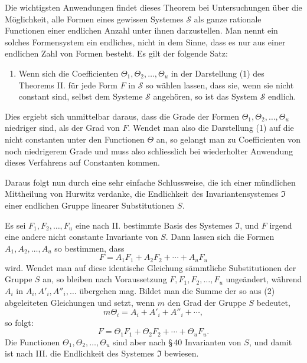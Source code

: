 \documentclass[11pt]{article}
\begin{document}
Die wichtigsten Anwendungen findet dieses Theorem bei Untersuchungen über die Möglichkeit, alle Formen eines gewissen Systemes $\mathcal S$ als ganze rationale Functionen einer endlichen Anzahl unter ihnen darzustellen. Man nennt ein solches Formensystem ein endliches, nicht in dem Sinne, dass es nur aus einer endlichen Zahl von Formen besteht. Es gilt der folgende Satz:

\begin{enumerate}[label=\Roman*.,leftmargin=2.4em,start=3]
\item Wenn sich die Coefficienten $\Theta_1,\Theta_2,\ldots,\Theta_u$ in der Darstellung (1) des Theorems II. für jede Form $F$ in $\mathcal S$ so wählen lassen, dass sie, wenn sie nicht constant sind, selbst dem Systeme $\mathcal S$ angehören, so ist das System $\mathcal S$ endlich.
\end{enumerate}
Dies ergiebt sich unmittelbar daraus, dass die Grade der Formen $\Theta_1,\Theta_2,\ldots,\Theta_u$ niedriger sind, als der Grad von $F$. Wendet man also die Darstellung (1) auf die nicht constanten unter den Functionen $\Theta$ an, so gelangt man zu Coefficienten von noch niedrigerem Grade und muss also schliesslich bei wiederholter Anwendung dieses Verfahrens auf Constanten kommen.

Daraus folgt nun durch eine sehr einfache Schlussweise, die ich einer mündlichen Mittheilung von Hurwitz verdanke, die Endlichkeit des Invariantensystemes $\mathfrak I$ einer endlichen Gruppe linearer Substitutionen $S$.

Es sei $F_1,F_2,\ldots,F_u$ eine nach II. bestimmte Basis des Systemes $\mathfrak I$, und $F$ irgend eine andere nicht constante Invariante von $S$. Dann lassen sich die Formen $A_1,A_2,\ldots,A_u$ so bestimmen, dass
\begin{equation}
F=A_1F_1+A_2F_2+\cdots+A_uF_u
\tag{2}
\end{equation}
wird. Wendet man auf diese identische Gleichung sämmtliche Substitutionen der Gruppe $S$ an, so bleiben nach Voraussetzung $F,F_1,F_2,\ldots,F_u$ ungeändert, während $A_i$ in $A_i,A'_i,A''_i,\ldots$ übergehen mag. Bildet man die Summe der so aus (2) abgeleiteten Gleichungen und setzt, wenn $m$ den Grad der Gruppe $S$ bedeutet,
\begin{equation}
m\Theta_i=A_i+A'_i+A''_i+\cdots,
\tag{3}
\end{equation}
so folgt:
\begin{equation}
F=\Theta_1F_1+\Theta_2F_2+\cdots+\Theta_uF_u.
\tag{4}
\end{equation}
Die Functionen $\Theta_1,\Theta_2,\ldots,\Theta_u$ sind aber nach \S\,40 Invarianten von $S$, und damit ist nach III. die Endlichkeit des Systemes $\mathfrak I$ bewiesen.
\end{document}
